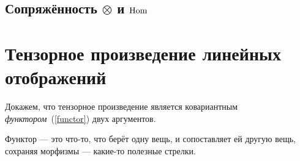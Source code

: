 \subsection{Сопряжённость $\otimes$ и $\operatorname{Hom}$}


\section{Тензорное произведение линейных отображений}
Докажем, что тензорное произведение является ковариантным \emph{функтором}~(\ref{functor}) двух аргументов.

Функтор --- это что-то, что берёт одну вещь, и сопоставляет ей другую вещь, сохраняя морфизмы --- какие-то полезные стрелки.



